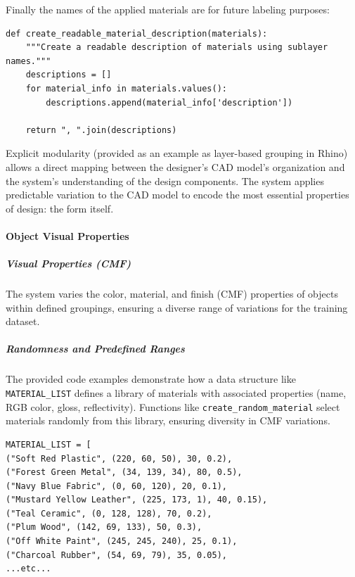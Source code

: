 \documentclass[12pt]{article}
\begin{document}
Finally the names of the applied materials are for future labeling purposes:
\begin{verbatim}
def create_readable_material_description(materials):
    """Create a readable description of materials using sublayer names."""
    descriptions = []
    for material_info in materials.values():
        descriptions.append(material_info['description'])
    
    return ", ".join(descriptions)
\end{verbatim}  

Explicit modularity (provided as an example as layer-based grouping in Rhino) allows a direct mapping between the designer's CAD model's organization and the system's understanding of the design components. The system applies predictable variation to the CAD model to encode the most essential properties of design: the form itself.

\paragraph{Object Visual Properties}

\subparagraph{Visual Properties (CMF)}
The system varies the color, material, and finish (CMF) properties of objects within defined groupings, ensuring a diverse range of variations for the training dataset.



\subparagraph{Randomness and Predefined Ranges}
 The provided code examples demonstrate how a data structure like \texttt{MATERIAL\_LIST} defines a library of materials with associated properties (name, RGB color, gloss, reflectivity). Functions like \texttt{create\_random\_material} select materials randomly from this library, ensuring diversity in CMF variations.

\begin{verbatim}
MATERIAL_LIST = [
("Soft Red Plastic", (220, 60, 50), 30, 0.2),
("Forest Green Metal", (34, 139, 34), 80, 0.5),
("Navy Blue Fabric", (0, 60, 120), 20, 0.1),
("Mustard Yellow Leather", (225, 173, 1), 40, 0.15),
("Teal Ceramic", (0, 128, 128), 70, 0.2),
("Plum Wood", (142, 69, 133), 50, 0.3),
("Off White Paint", (245, 245, 240), 25, 0.1),
("Charcoal Rubber", (54, 69, 79), 35, 0.05),
...etc...
\end{verbatim}
\end{document}
